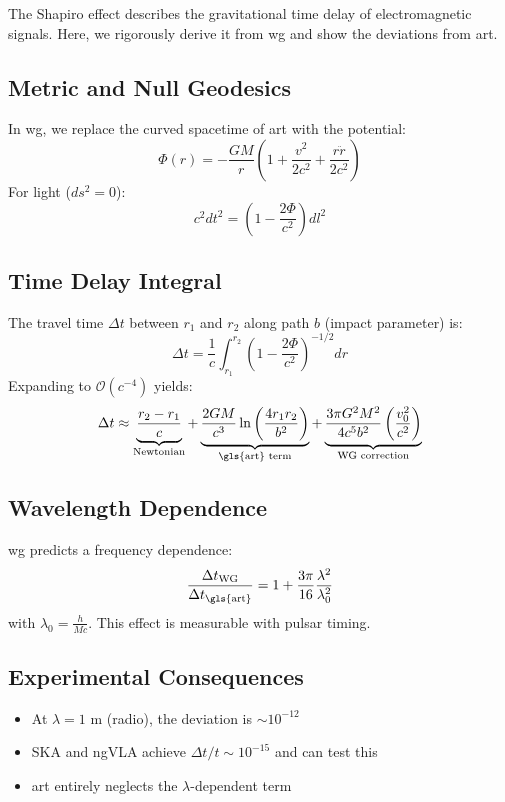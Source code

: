 The Shapiro effect describes the gravitational time delay of electromagnetic signals. Here, we rigorously derive it from \gls{wg} and show the deviations from \gls{art}.

\subsection{Metric and Null Geodesics}
In \gls{wg}, we replace the curved spacetime of \gls{art} with the potential:
\begin{equation}
\Phi(r) = -\frac{GM}{r}\left(1 + \frac{v^2}{2c^2} + \frac{r\ddot{r}}{2c^2}\right)
\end{equation}
For light ($ds^2 = 0$):
\begin{equation}
c^2dt^2 = \left(1 - \frac{2\Phi}{c^2}\right)dl^2
\end{equation}

\subsection{Time Delay Integral}
The travel time $\Delta t$ between $r_1$ and $r_2$ along path $b$ (impact parameter) is:
\begin{equation}
\Delta t = \frac{1}{c}\int_{r_1}^{r_2} \left(1 - \frac{2\Phi}{c^2}\right)^{-1/2} dr
\end{equation}
Expanding to $\mathcal{O}(c^{-4})$ yields:
\begin{equation}
\Delta t \approx \underbrace{\frac{r_2 - r_1}{c}}_{\text{Newtonian}} + \underbrace{\frac{2GM}{c^3}\ln\left(\frac{4r_1r_2}{b^2}\right)}_{\text{\gls{art} term}} + \underbrace{\frac{3\pi G^2M^2}{4c^5b^2}\left(\frac{v_0^2}{c^2}\right)}_{\text{WG correction}}
\end{equation}

\subsection{Wavelength Dependence}
\gls{wg} predicts a frequency dependence:
\begin{equation}
\frac{\Delta t_{\text{WG}}}{\Delta t_{\text{\gls{art}}}} = 1 + \frac{3\pi}{16}\frac{\lambda^2}{\lambda_0^2}
\end{equation}
with $\lambda_0 = \frac{h}{Mc}$. This effect is measurable with pulsar timing.

\subsection{Experimental Consequences}
\begin{itemize}
\item At $\lambda = 1$ m (radio), the deviation is $\sim 10^{-12}$
\item SKA and ngVLA achieve $\Delta t/t \sim 10^{-15}$ and can test this
\item \gls{art} entirely neglects the $\lambda$-dependent term
\end{itemize}


